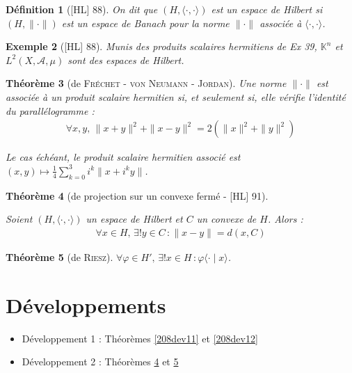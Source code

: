 \documentclass[10pt, a4paper, parskip=full, twoside, twocolumn]{report}
\newtheorem{definition}{Définition}
\newtheorem{theorem}[definition]{Théorème}
\newtheorem{example}[definition]{Exemple}
\newcommand{\IK}{\mathbb{K}}
\newcommand{\A}{\mathscr{A}}
\begin{document}
\begin{definition}[\textnormal{[HL] 88}]
	On dit que $(H, \langle\cdot,\cdot\rangle)$ est un \emph{espace de Hilbert} si $(H,\|\cdot\|)$ est 
	un espace de Banach pour la norme $\|\cdot\|$ associée à $\langle\cdot,\cdot\rangle$.
\end{definition}

\begin{example}[\textnormal{[HL] 88}]
	Munis des produits scalaires hermitiens de Ex 39, $\IK^n$ et $L^2(X,\A,\mu)$ sont des espaces de Hilbert.
\end{example}

\begin{theorem}[de \textsc{Fréchet - von Neumann - Jordan}]
	Une norme $\|\cdot\|$ est associée à un produit scalaire hermitien si, et seulement si, elle vérifie l'identité du parallélogramme :
	\begin{align*}
		\forall x,y,\, \|x+y\|^2 + \|x-y\|^2 = 2(\|x\|^2 + \|y\|^2)
	\end{align*}

	Le cas échéant, le produit scalaire hermitien associé est $(x,y)\mapsto \frac{1}{4}\sum_{k=0}^{3} i^k\|x+i^ky\|$.
\end{theorem}

\begin{tcolorbox}[
    breakable, %
    colback=developpement, %
    colframe=gray!0!black, %
    boxrule=0pt, %
    arc=1mm, %
	boxsep=0pt,
	left=0pt, right=0pt, top=0pt, bottom=0pt
]
\begin{theorem}[de projection sur un convexe fermé - \textnormal{[HL] 91}]
	\label{208dev21}

	Soient $(H,\langle\cdot,\cdot\rangle)$ un espace de Hilbert et $C$ un convexe de $H$. Alors :
	\begin{align*}
		\forall x\in H,\, \exists ! y\in C\,\colon \|x-y\| = d(x,C)
	\end{align*}
\end{theorem}

\begin{theorem}[de \textsc{Riesz}]
	\label{208dev22}
	$\forall\varphi \in H',\, \exists ! x\in H\,\colon \varphi\langle \cdot \mid x\rangle$.
\end{theorem}
\end{tcolorbox}


\section*{Développements}
\begin{itemize}
	\item Développement 1 : Théorèmes \ref{208dev11} et \ref{208dev12}
	\item Développement 2 : Théorèmes \ref{208dev21} et \ref{208dev22}
\end{itemize}
\end{document}
